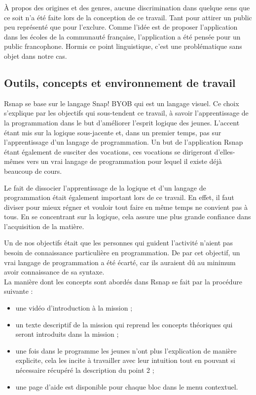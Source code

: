 À propos des origines et des genres, aucune discrimination dans quelque sens que ce soit n'a été faite lors de la conception de ce travail. Tant pour attirer un public peu représenté que pour l'exclure. Comme l'idée est de proposer l'application dans les écoles de la communauté française, l'application a été pensée pour un public francophone. Hormis ce point linguistique, c'est une problématique sans objet dans notre cas.

\subsection{Outils, concepts et environnement de travail} 
\label{SNAP}
Rsnap se base sur le langage Snap! BYOB qui est un langage visuel. Ce choix s'explique par les objectifs qui sous-tendent ce travail, à savoir l'apprentissage de la programmation dans le but d'améliorer l'esprit logique des jeunes. L'accent étant mis sur la logique sous-jacente et, dans un premier temps, pas sur l'apprentissage d'un langage de programmation. Un but de l'application Rsnap étant également de susciter des vocations, ces vocations se dirigeront d'elles-mêmes vers un vrai langage de programmation pour lequel il existe déjà beaucoup de cours.

Le fait de dissocier l'apprentissage de la logique et d'un langage de programmation était également important lors de ce travail. En effet, il faut diviser pour mieux régner et vouloir tout faire en même temps ne convient pas à tous. En se concentrant sur la logique, cela assure une plus grande confiance dans l'acquisition de la matière.

Un de nos objectifs était que les personnes qui guident l'activité n'aient pas besoin de connaissance particulière en programmation. De par cet objectif, un vrai langage de programmation a été écarté, car ils auraient dû au minimum avoir connaissance de sa syntaxe.\\

La manière dont les concepts sont abordés dans Rsnap se fait par la procédure suivante :
\begin{itemize}
	\item une vidéo d'introduction à la mission ;
	\item un texte descriptif de la mission qui reprend les concepts théoriques qui seront introduits dans la mission ;
	\item une fois dans le programme les jeunes n'ont plus l'explication de manière explicite, cela les incite à travailler avec leur intuition tout en pouvant si nécessaire récupéré la description du point 2 ;
	\item une page d'aide est disponible pour chaque bloc dans le menu contextuel.
\end{itemize}

